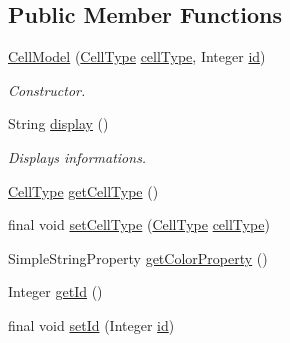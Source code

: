 \subsection*{Public Member Functions}
\begin{DoxyCompactItemize}
\item 
\hyperlink{classbattleship2D_1_1model_1_1CellModel_a9681f351cc619c88cb389c2f00a9a44d}{Cell\-Model} (\hyperlink{enumbattleship2D_1_1model_1_1CellType}{Cell\-Type} \hyperlink{classbattleship2D_1_1model_1_1CellModel_a5c1cadcce5c5639ae76d6d092fa8d510}{cell\-Type}, Integer \hyperlink{classbattleship2D_1_1model_1_1CellModel_a13643b1cd9553923ad542cf6c594d3c3}{id})
\begin{DoxyCompactList}\small\item\em Constructor. \end{DoxyCompactList}\item 
String \hyperlink{classbattleship2D_1_1model_1_1CellModel_aca1e2e88cbd929dc24aa7de4f15bd7a2}{display} ()
\begin{DoxyCompactList}\small\item\em Displays informations. \end{DoxyCompactList}\item 
\hyperlink{enumbattleship2D_1_1model_1_1CellType}{Cell\-Type} \hyperlink{classbattleship2D_1_1model_1_1CellModel_ae5c252d3bf4db6efc04f257096ff5522}{get\-Cell\-Type} ()
\item 
final void \hyperlink{classbattleship2D_1_1model_1_1CellModel_aa4b33ed17badf1b1058d554c23d324bc}{set\-Cell\-Type} (\hyperlink{enumbattleship2D_1_1model_1_1CellType}{Cell\-Type} \hyperlink{classbattleship2D_1_1model_1_1CellModel_a5c1cadcce5c5639ae76d6d092fa8d510}{cell\-Type})
\item 
Simple\-String\-Property \hyperlink{classbattleship2D_1_1model_1_1CellModel_ab76410b942fa598a6798da97256d0b23}{get\-Color\-Property} ()
\item 
Integer \hyperlink{classbattleship2D_1_1model_1_1CellModel_ac157a53ff0edf60519ce94795296da0d}{get\-Id} ()
\item 
final void \hyperlink{classbattleship2D_1_1model_1_1CellModel_ad3cf39763eb70d7ee5f4efa1553a5268}{set\-Id} (Integer \hyperlink{classbattleship2D_1_1model_1_1CellModel_a13643b1cd9553923ad542cf6c594d3c3}{id})
\end{DoxyCompactItemize}
